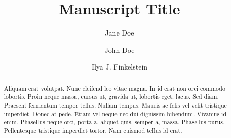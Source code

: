 



\title{Manuscript Title}
\author[1, *]{Jane Doe}
\author[1]{John Doe}
\author[1,2,*]{Ilya J. Finkelstein}

\date{}  %


\listoftodos 

\maketitle

\begin{abstract} 
\noindent
Aliquam erat volutpat.  Nunc eleifend leo vitae magna.  In id erat non orci commodo lobortis.  Proin neque massa, cursus ut, gravida ut, lobortis eget, lacus.  Sed diam.  Praesent fermentum tempor tellus.  Nullam tempus.  Mauris ac felis vel velit tristique imperdiet.  Donec at pede.  Etiam vel neque nec dui dignissim bibendum.  Vivamus id enim.  Phasellus neque orci, porta a, aliquet quis, semper a, massa.  Phasellus purus.  Pellentesque tristique imperdiet tortor.  Nam euismod tellus id erat.
\end{abstract}


\newpage           






\newpage 
          
\printbibliography






